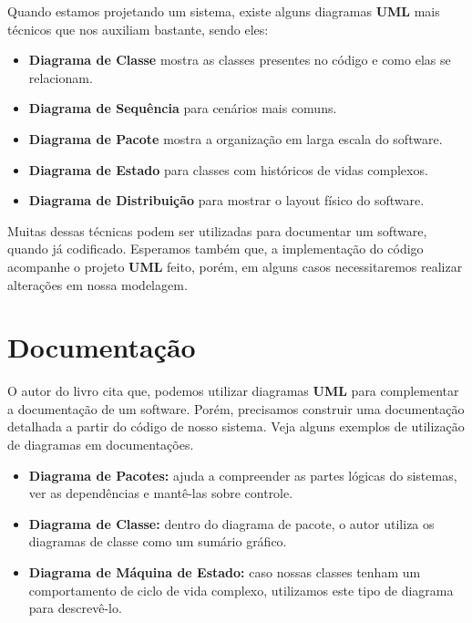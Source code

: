 \documentclass[a4paper, 12pt]{report}
\begin{document}
	Quando estamos projetando um sistema, existe alguns diagramas \textbf{UML} mais técnicos que nos auxiliam bastante, sendo eles:
	
	\begin{itemize}
		\item \textbf{Diagrama de Classe} mostra as classes presentes no código e como elas se relacionam.
		
		\item \textbf{Diagrama de Sequência} para cenários mais comuns.
		
		\item \textbf{Diagrama de Pacote} mostra a organização em larga escala do software.
		
		\item \textbf{Diagrama de Estado} para classes com históricos de vidas complexos.
		
		\item \textbf{Diagrama de Distribuição} para mostrar o layout físico do software.
	\end{itemize}
	
	Muitas dessas técnicas podem ser utilizadas para documentar um software, quando já codificado. Esperamos também que, a implementação do código acompanhe o projeto \textbf{UML} feito, porém, em alguns casos necessitaremos realizar alterações em nossa modelagem.
		
		
	\section{Documentação}
	
	O autor do livro cita que, podemos utilizar diagramas \textbf{UML} para complementar a documentação de um software. Porém, precisamos construir uma documentação detalhada a partir do código de nosso sistema. Veja alguns exemplos de utilização de diagramas em documentações.
	
	\begin{itemize}
		\item \textbf{Diagrama de Pacotes:} ajuda a compreender as partes lógicas do sistemas, ver as dependências e mantê-las sobre controle.
		
		\item \textbf{Diagrama de Classe:} dentro do diagrama de pacote, o autor utiliza os diagramas de classe como um sumário gráfico.
		
		\item \textbf{Diagrama de Máquina de Estado:} caso nossas classes tenham um comportamento de ciclo de vida complexo, utilizamos este tipo de diagrama para descrevê-lo.
	\end{itemize}
\end{document}
